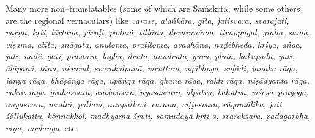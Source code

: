 Many more non–translatables (some of which are Saṁskṛta, while some others are the regional vernaculars) like \textit{varase, alaṅkāra, gīta, jatisvara, svarajati, varṇa, kṛti, kīrtana, jāvaḷi, padaṁ, tillāna, devaranāma, tiruppugaḻ, graha, sama, viṣama, atīta, anāgata, anuloma, pratiloma, avadhāna, naḍêbheda, kriya, aṅga, jāti, naḍê, gati, prastāra, laghu, druta, anudruta, guru, pluta, kākapāda, yati, ālāpanā, tāna, nêraval, svarakalpanā, viruttam, ugābhoga, suḷādi, janaka rāga, janya rāga, bhāṣāṅga rāga, upāṅga rāga, ghana rāga, rakti rāga, niṣādyanta rāga, vakra rāga, grahasvara, aṁśasvara, nyāsasvara, alpatva, bahutva, viśeṣa–prayoga, anyasvara, mudrā, pallavi, anupallavi, carana, ciṭṭesvara, rāgamālika, jati, śôllukaṭṭu, kônnakkol, madhyama śruti, samudāya kṛti}–s, \textit{svarākṣara, padagarbha, vīṇā, mṛdaṅga}, etc.

